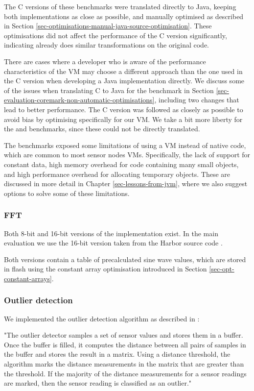 The C versions of these benchmarks were translated directly to Java, keeping both implementations as close as possible, and manually optimised as described in Section \ref{sec-optimisations-manual-java-source-optimisation}. These optimisations did not affect the performance of the C version significantly, indicating  already does similar transformations on the original code.

There are cases where a developer who is aware of the performance characteristics of the VM may choose a different approach than the one used in the C version when developing a Java implementation directly. We discuss some of the issues when translating C to Java for the  benchmark in Section \ref{sec-evaluation-coremark-non-automatic-optimisations}, including two changes that lead to better performance. The C version was followed as closely as possible to avoid bias by optimising specifically for our VM. We take a bit more liberty for the  and  benchmarks, since these could not be directly translated.

The benchmarks exposed some limitations of using a VM instead of native code, which are common to most sensor nodes VMs. Specifically, the lack of support for constant data, high memory overhead for code containing many small objects, and high performance overhead for allocating temporary objects. These are discussed in more detail in Chapter \ref{sec-lessons-from-jvm}, where we also suggest options to solve some of these limitations.

\subsubsection{FFT}
Both 8-bit and 16-bit versions of the  implementation exist. In the main evaluation we use the 16-bit version taken from the Harbor source code \cite{sos-operating-system}.

Both versions contain a table of precalculated sine wave values, which are stored in flash using the constant array optimisation introduced in Section \ref{sec-opt-constant-arrays}.

\subsubsection{Outlier detection}
We implemented the outlier detection algorithm as described in \cite{Kumar:2007ge}:

\begin{displayquote}
"The outlier detector samples a set of sensor values and stores them in a buffer. Once the buffer is filled, it computes the distance between all pairs of samples in the buffer and stores the result in a matrix. Using a distance threshold, the algorithm marks the distance measurements in the matrix that are greater than the threshold. If the majority of the distance measurements for a sensor readings are marked, then the sensor reading is classified as an outlier."
\end{displayquote}


